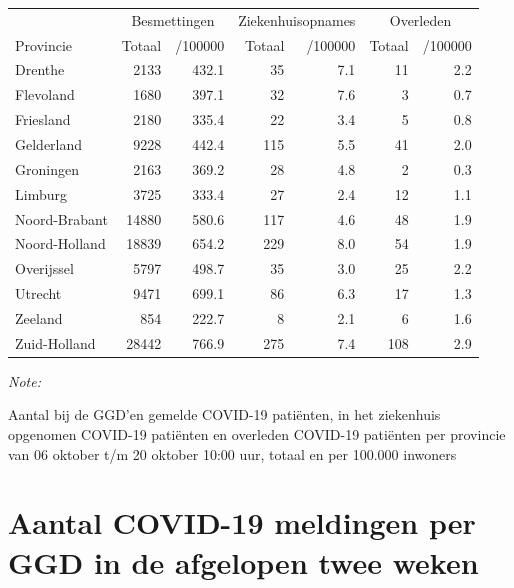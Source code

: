 \documentclass[
  english,
  man,floatsintext]{apa6}
\begin{document}
\begin{table}[H]
\centering
\begin{threeparttable}
\begin{tabular}{lrrrrrr}
\toprule
\multicolumn{1}{c}{ } & \multicolumn{2}{c}{Besmettingen} & \multicolumn{2}{c}{Ziekenhuisopnames} & \multicolumn{2}{c}{Overleden} \\
\cmidrule(l{3pt}r{3pt}){2-3} \cmidrule(l{3pt}r{3pt}){4-5} \cmidrule(l{3pt}r{3pt}){6-7}
Provincie & Totaal & /100000 & Totaal & /100000 & Totaal & /100000\\
\midrule
Drenthe & 2133 & 432.1 & 35 & 7.1 & 11 & 2.2\\
Flevoland & 1680 & 397.1 & 32 & 7.6 & 3 & 0.7\\
Friesland & 2180 & 335.4 & 22 & 3.4 & 5 & 0.8\\
Gelderland & 9228 & 442.4 & 115 & 5.5 & 41 & 2.0\\
Groningen & 2163 & 369.2 & 28 & 4.8 & 2 & 0.3\\
Limburg & 3725 & 333.4 & 27 & 2.4 & 12 & 1.1\\
Noord-Brabant & 14880 & 580.6 & 117 & 4.6 & 48 & 1.9\\
Noord-Holland & 18839 & 654.2 & 229 & 8.0 & 54 & 1.9\\
Overijssel & 5797 & 498.7 & 35 & 3.0 & 25 & 2.2\\
Utrecht & 9471 & 699.1 & 86 & 6.3 & 17 & 1.3\\
Zeeland & 854 & 222.7 & 8 & 2.1 & 6 & 1.6\\
Zuid-Holland & 28442 & 766.9 & 275 & 7.4 & 108 & 2.9\\
\bottomrule
\end{tabular}
\begin{tablenotes}
\item \textit{Note: } 
\item Aantal bij de GGD’en gemelde COVID-19 patiënten, in het ziekenhuis opgenomen COVID-19 patiënten en overleden COVID-19 patiënten per provincie van 06 oktober t/m 20 oktober 10:00 uur, totaal en per 100.000 inwoners
\end{tablenotes}
\end{threeparttable}
\end{table}

\newpage

\hypertarget{aantal-covid-19-meldingen-per-ggd-in-de-afgelopen-twee-weken}{%
\section{Aantal COVID-19 meldingen per GGD in de afgelopen twee weken}\label{aantal-covid-19-meldingen-per-ggd-in-de-afgelopen-twee-weken}}
\end{document}
